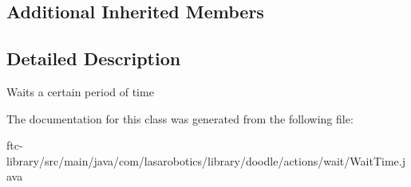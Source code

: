\subsection*{Additional Inherited Members}


\subsection{Detailed Description}
Waits a certain period of time 

The documentation for this class was generated from the following file\+:\begin{DoxyCompactItemize}
\item 
ftc-\/library/src/main/java/com/lasarobotics/library/doodle/actions/wait/Wait\+Time.\+java\end{DoxyCompactItemize}

